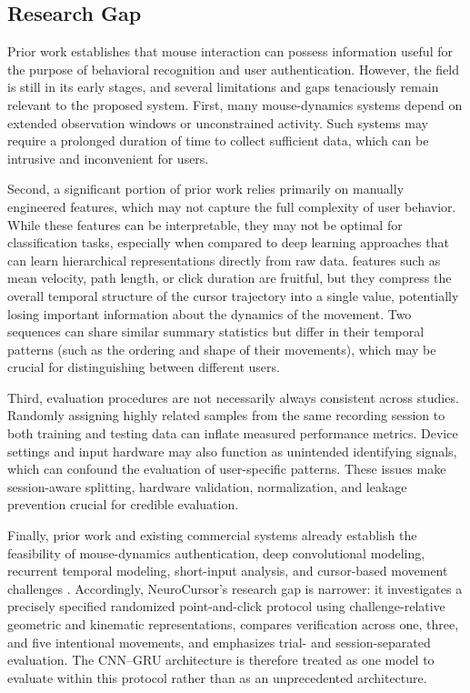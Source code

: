 \documentclass[conference]{IEEEtran}
\begin{document}
\subsection{Research Gap}

Prior work establishes that mouse interaction can possess information useful for the purpose of behavioral recognition and user authentication. However, the field is still in its early stages, and several limitations and gaps tenaciously remain relevant to the proposed system. First, many mouse-dynamics systems depend on extended observation windows or unconstrained activity. Such systems may require a prolonged duration of time to collect sufficient data, which can be intrusive and inconvenient for users. 

Second, a significant portion of prior work relies primarily on manually engineered features, which may not capture the full complexity of user behavior. While these features can be interpretable, they may not be optimal for classification tasks, especially when compared to deep learning approaches that can learn hierarchical representations directly from raw data. features such as mean velocity, path length, or click duration are fruitful, but they compress the overall temporal structure of the cursor trajectory into a single value, potentially losing important information about the dynamics of the movement. Two sequences can share similar summary statistics but differ in their temporal patterns (such as the ordering and shape of their movements), which may be crucial for distinguishing between different users.

Third, evaluation procedures are not necessarily always consistent across studies. Randomly assigning highly related samples from the same recording session to both training and testing data can inflate measured performance metrics. Device settings and input hardware may also function as unintended identifying signals, which can confound the evaluation of user-specific patterns. These issues make session-aware splitting, hardware validation, normalization, and leakage prevention crucial for credible evaluation.

Finally, prior work and existing commercial systems already establish the feasibility of mouse-dynamics authentication, deep convolutional modeling, recurrent temporal modeling, short-input analysis, and cursor-based movement challenges \cite{antalFejer2020,wang2025Mouse,graboxyChallenge}. Accordingly, NeuroCursor's research gap is narrower: it investigates a precisely specified randomized point-and-click protocol using challenge-relative geometric and kinematic representations, compares verification across one, three, and five intentional movements, and emphasizes trial- and session-separated evaluation. The CNN--GRU architecture is therefore treated as one model to evaluate within this protocol rather than as an unprecedented architecture.
\end{document}
